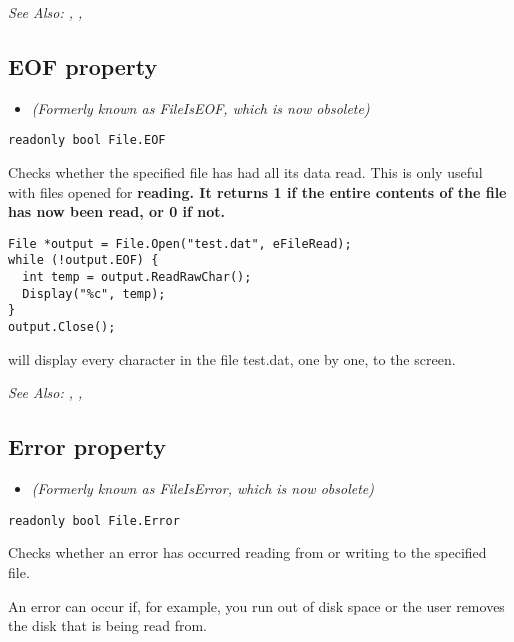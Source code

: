 \it{See Also:} , ,


\subsection{EOF property}\label{File.EOF}%

\begin{itemize}
\item \it{(Formerly known as FileIsEOF, which is now obsolete)}
\end{itemize}

\begin{verbatim}
readonly bool File.EOF
\end{verbatim}
Checks whether the specified file has had all its data read. This is only useful
with files opened for \bf{reading}. It returns 1 if the entire contents of the file
has now been read, or 0 if not.

\begin{verbatim}
File *output = File.Open("test.dat", eFileRead);
while (!output.EOF) {
  int temp = output.ReadRawChar();
  Display("%c", temp);
}
output.Close();
\end{verbatim}
will display every character in the file test.dat, one by one, to the screen.

\it{See Also:} , ,


\subsection{Error property}\label{File.Error}%

\begin{itemize}
\item \it{(Formerly known as FileIsError, which is now obsolete)}
\end{itemize}

\begin{verbatim}
readonly bool File.Error
\end{verbatim}
Checks whether an error has occurred reading from or writing to the specified file.

An error can occur if, for example, you run out of disk space or the user removes the
disk that is being read from.

